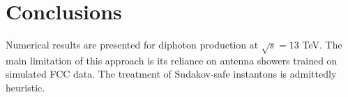 \section{Conclusions}\label{sec:conclusions}

Numerical results are presented for diphoton production at $\sqrt{s} =
13$ TeV. The main limitation of this approach is its reliance on antenna
showers trained on simulated FCC data. The treatment of Sudakov-safe
instantons is admittedly heuristic.

